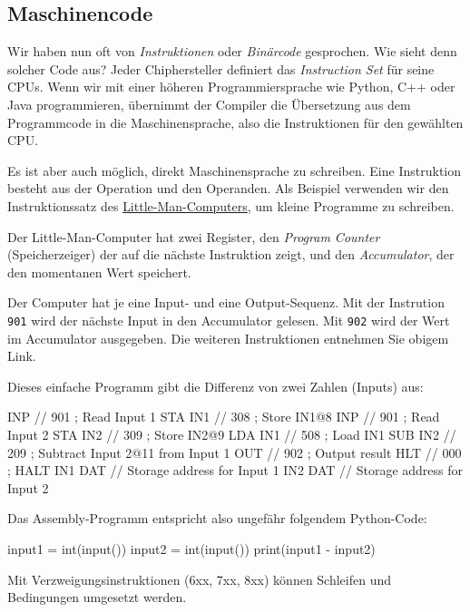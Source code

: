 \subsection{Maschinencode}

Wir haben nun oft von \emph{Instruktionen} oder \emph{Binärcode} gesprochen. Wie sieht denn solcher Code aus? Jeder Chiphersteller definiert das \emph{Instruction Set} für seine CPUs. Wenn wir mit einer höheren Programmiersprache wie Python, C++ oder Java programmieren, übernimmt der Compiler die Übersetzung aus dem Programmcode in die Maschinensprache, also die Instruktionen für den gewählten CPU.

Es ist aber auch möglich, direkt Maschinensprache zu schreiben. Eine Instruktion besteht aus der Operation und den Operanden. Als Beispiel verwenden wir den Instruktionssatz des \href{https://en.wikipedia.org/wiki/Little_man_computer}{Little-Man-Computers}, um kleine Programme zu schreiben.

Der Little-Man-Computer hat zwei Register, den \emph{Program Counter} (Speicherzeiger) der auf die nächste Instruktion zeigt, und den \emph{Accumulator}, der den momentanen Wert speichert.

Der Computer hat je eine Input- und eine Output-Sequenz. Mit der Instrution \texttt{901} wird der nächste Input in den Accumulator gelesen. Mit \texttt{902} wird der Wert im Accumulator ausgegeben. Die weiteren Instruktionen entnehmen Sie obigem Link.

Dieses einfache Programm gibt die Differenz von zwei Zahlen (Inputs) aus:
\begin{assembly}
    INP     // 901  ; Read Input 1
    STA IN1 // 308  ; Store IN1@8
    INP     // 901  ; Read Input 2
    STA IN2 // 309  ; Store IN2@9
    LDA IN1 // 508  ; Load IN1
    SUB IN2 // 209  ; Subtract Input 2@11 from Input 1
    OUT     // 902  ; Output result
    HLT     // 000  ; HALT
IN1 DAT		// Storage address for Input 1
IN2 DAT		// Storage address for Input 2
\end{assembly}

Das Assembly-Programm entspricht also ungefähr folgendem Python-Code:

\begin{python}
input1 = int(input())
input2 = int(input())
print(input1 - input2)
\end{python}

Mit Verzweigungsinstruktionen (6xx, 7xx, 8xx) können Schleifen und Bedingungen umgesetzt werden. 

